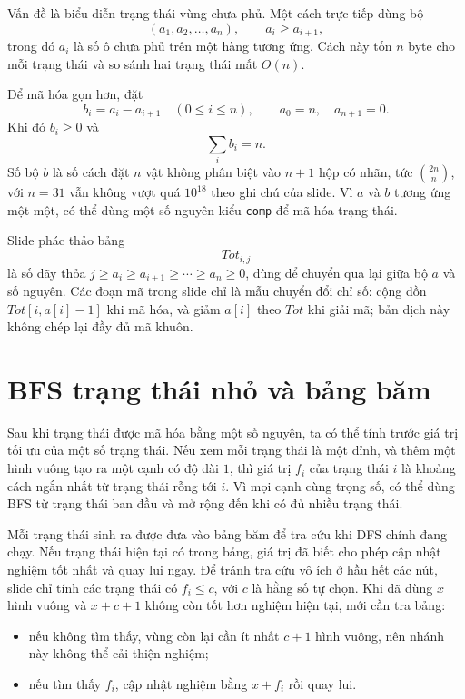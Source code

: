 \documentclass[11pt]{article}
\begin{document}
Vấn đề là biểu diễn trạng thái vùng chưa phủ. Một cách trực tiếp dùng bộ
\[
  (a_1,a_2,\ldots,a_n),\qquad a_i\ge a_{i+1},
\]
trong đó \(a_i\) là số ô chưa phủ trên một hàng tương ứng. Cách này tốn
\(n\) byte cho mỗi trạng thái và so sánh hai trạng thái mất \(O(n)\).

Để mã hóa gọn hơn, đặt
\[
  b_i=a_i-a_{i+1}\quad (0\le i\le n),
  \qquad a_0=n,\quad a_{n+1}=0.
\]
Khi đó \(b_i\ge0\) và
\[
  \sum_i b_i=n.
\]
Số bộ \(b\) là số cách đặt \(n\) vật không phân biệt vào \(n+1\) hộp có nhãn,
tức \(\binom{2n}{n}\), với \(n=31\) vẫn không vượt quá \(10^{18}\) theo ghi
chú của slide. Vì \(a\) và \(b\) tương ứng một-một, có thể dùng một số nguyên
kiểu \texttt{comp} để mã hóa trạng thái.

Slide phác thảo bảng
\[
  Tot_{i,j}
\]
là số dãy thỏa \(j\ge a_i\ge a_{i+1}\ge\cdots\ge a_n\ge0\), dùng để chuyển
qua lại giữa bộ \(a\) và số nguyên. Các đoạn mã trong slide chỉ là mẫu chuyển
đổi chỉ số: cộng dồn \(Tot[i,a[i]-1]\) khi mã hóa, và giảm \(a[i]\) theo
\(Tot\) khi giải mã; bản dịch này không chép lại đầy đủ mã khuôn.

\section{BFS trạng thái nhỏ và bảng băm}

Sau khi trạng thái được mã hóa bằng một số nguyên, ta có thể tính trước giá
trị tối ưu của một số trạng thái. Nếu xem mỗi trạng thái là một đỉnh, và thêm
một hình vuông tạo ra một cạnh có độ dài \(1\), thì giá trị \(f_i\) của trạng
thái \(i\) là khoảng cách ngắn nhất từ trạng thái rỗng tới \(i\). Vì mọi cạnh
cùng trọng số, có thể dùng BFS từ trạng thái ban đầu và mở rộng đến khi có
đủ nhiều trạng thái.

Mỗi trạng thái sinh ra được đưa vào bảng băm để tra cứu khi DFS chính đang
chạy. Nếu trạng thái hiện tại có trong bảng, giá trị đã biết cho phép cập
nhật nghiệm tốt nhất và quay lui ngay. Để tránh tra cứu vô ích ở hầu hết các
nút, slide chỉ tính các trạng thái có \(f_i\le c\), với \(c\) là hằng số tự
chọn. Khi đã dùng \(x\) hình vuông và \(x+c+1\) không còn tốt hơn nghiệm
hiện tại, mới cần tra bảng:
\begin{itemize}
  \item nếu không tìm thấy, vùng còn lại cần ít nhất \(c+1\) hình vuông, nên
  nhánh này không thể cải thiện nghiệm;
  \item nếu tìm thấy \(f_i\), cập nhật nghiệm bằng \(x+f_i\) rồi quay lui.
\end{itemize}
\end{document}
